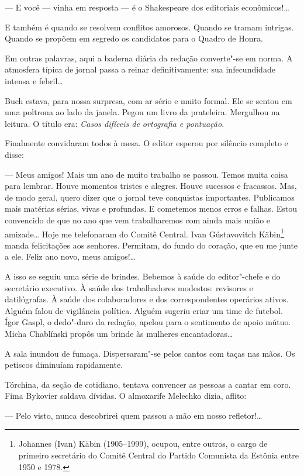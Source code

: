 --- E você --- vinha em resposta --- é o Shakespeare dos editoriais
econômicos!\ldots{}

E também é quando se resolvem conflitos amorosos. Quando se tramam
intrigas. Quando se propõem em segredo os candidatos para o Quadro de
Honra.

Em outras palavras, aqui a baderna diária da redação converte"-se em
norma. A atmosfera típica de jornal passa a reinar definitivamente: sua
infecundidade intensa e febril\ldots{}

Buch estava, para nossa surpresa, com ar sério e muito formal. Ele se
sentou em uma poltrona ao lado da janela. Pegou um livro da prateleira.
Mergulhou na leitura. O título era: \emph{Casos difíceis de ortografia e
pontuação}.

Finalmente convidaram todos à mesa. O editor esperou por silêncio
completo e disse:

--- Meus amigos! Mais um ano de muito trabalho se passou. Temos muita
coisa para lembrar. Houve momentos tristes e alegres. Houve sucessos e
fracassos. Mas, de modo geral, quero dizer que o jornal teve conquistas
importantes. Publicamos mais matérias sérias, vivas e profundas. E
cometemos menos erros e falhas. Estou convencido de que no ano que vem
trabalharemos com ainda mais união e amizade\ldots{} Hoje me telefonaram do
Comitê Central. Ivan Gústavovitch Käbin\footnote{Johannes (Ivan) Käbin
  (1905--1999), ocupou, entre outros, o cargo de primeiro secretário do Comitê Central
  do Partido Comunista da Estônia entre 1950 e 1978.}
manda felicitações aos senhores. Permitam, do fundo do coração, que eu
me junte a ele. Feliz ano novo, meus amigos!\ldots{}

A isso se seguiu uma série de brindes. Bebemos à saúde do editor"-chefe e
do secretário executivo. À saúde dos trabalhadores modestos: revisores e
datilógrafas. À saúde dos colaboradores e dos correspondentes operários
ativos. Alguém falou de vigilância política. Alguém sugeriu criar um
time de futebol. Ígor Gaspl, o dedo"-duro da redação, apelou para o
sentimento de apoio mútuo. Micha Chablínski propôs um brinde às mulheres
encantadoras\ldots{}

A sala inundou de fumaça. Dispersaram"-se pelos cantos com taças nas
mãos. Os petiscos diminuíam rapidamente.

Tórchina, da seção de cotidiano, tentava convencer as pessoas a cantar
em coro. Fima Bykovier saldava dívidas. O almoxarife Melechko dizia,
aflito:

--- Pelo visto, nunca descobrirei quem passou a mão em nosso
refletor!\ldots{}

